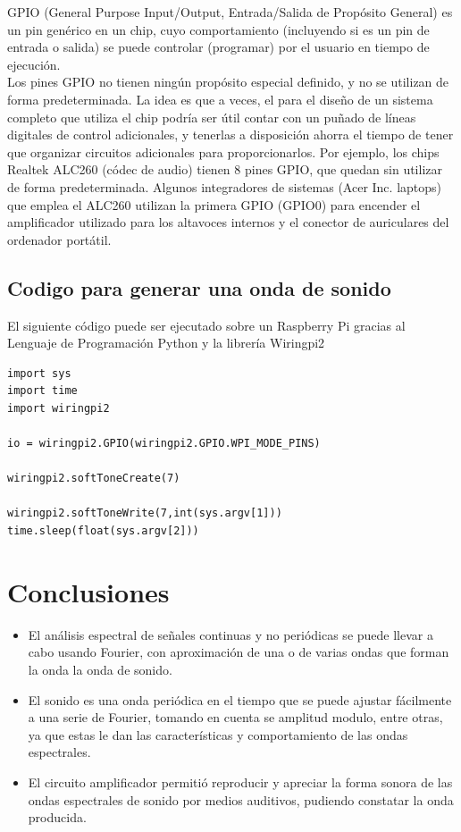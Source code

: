 \documentclass[10pt,a4paper]{book}
\begin{document}
GPIO (General Purpose Input/Output, Entrada/Salida de Propósito General) es un pin genérico en un chip, cuyo comportamiento (incluyendo si es un pin de entrada o salida) se puede controlar (programar) por el usuario en tiempo de ejecución.\\

Los pines GPIO no tienen ningún propósito especial definido, y no se utilizan de forma predeterminada. La idea es que a veces, el para el diseño de un sistema completo que utiliza el chip podría ser útil contar con un puñado de líneas digitales de control adicionales, y tenerlas a disposición ahorra el tiempo de tener que organizar circuitos adicionales para proporcionarlos. Por ejemplo, los chips Realtek ALC260 (códec de audio) tienen 8 pines GPIO, que quedan sin utilizar de forma predeterminada. Algunos integradores de sistemas (Acer Inc. laptops) que emplea el ALC260 utilizan la primera GPIO (GPIO0) para encender el amplificador utilizado para los altavoces internos y el conector de auriculares del ordenador portátil.\\

\subsection{Codigo para generar una onda de sonido}

El siguiente código puede ser ejecutado sobre un Raspberry Pi gracias al Lenguaje de Programación Python y la librería Wiringpi2
\begin{verbatim}
import sys
import time
import wiringpi2

io = wiringpi2.GPIO(wiringpi2.GPIO.WPI_MODE_PINS)

wiringpi2.softToneCreate(7)

wiringpi2.softToneWrite(7,int(sys.argv[1]))
time.sleep(float(sys.argv[2]))
\end{verbatim}



\section{Conclusiones}

\begin{itemize}

\item El análisis espectral de señales continuas y no periódicas se puede llevar a cabo usando Fourier, con aproximación de una o de varias ondas que forman la onda la onda de sonido.
\item El sonido es una onda periódica en el tiempo que se puede ajustar fácilmente a una serie de Fourier, tomando en cuenta se amplitud modulo, entre otras, ya que estas le  dan las características y comportamiento de las ondas espectrales. 
\item El circuito amplificador permitió reproducir y apreciar la forma sonora de las ondas espectrales de sonido por medios auditivos, pudiendo constatar la onda producida.

\end{itemize}
\end{document}

